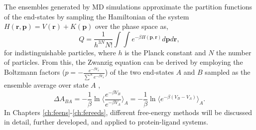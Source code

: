 The ensembles generated by MD simulations approximate the partition functions of the end-states by sampling the Hamiltonian of the system $H(\textbf{r},\textbf{p})=V(\textbf{r})+K(\textbf{p})$ over the phase space as,\cite{Allen2017} 
\begin{equation}
    Q = \frac{1}{h^{3N} N!}  \int \int e^{-\beta H(\textbf{p},\textbf{r})} d \textbf{p} d \textbf{r} ,
\end{equation}
for indistinguishable particles, where $h$ is the Planck constant and $N$ the number of particles.
%
From this, the Zwanzig equation\cite{Zwanzig1954} can be derived by employing the Boltzmann factors ($p=-\frac{e^{-\beta V_x}}{\sum^N e^{-\beta V_x}}$) of the two end-states $A$ and $B$ sampled as the ensemble average over state $A$ \cite{Zwanzig1954}, 
\begin{equation}
        \Delta A_{BA} 
        = -\frac{1}{\beta} \ln\Bigg\langle \frac{e^{-\beta V_B}}{e^{-\beta V_A}}\Bigg\rangle_A
        = -\frac{1}{\beta} \ln\Bigg\langle e^{-\beta (V_B-V_A)}\Bigg\rangle_A .
\end{equation}
In Chapters \ref{ch:feens}-\ref{ch:fereeds}, different free-energy methods will be discussed in detail, further developed, and applied to protein-ligand systems. 